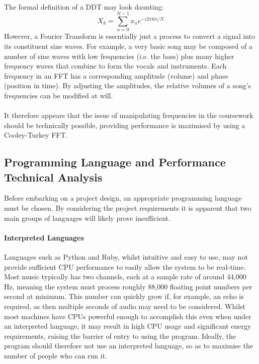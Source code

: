 \paragraph{}
The formal definition of a DDT may look daunting:
\[
X_k = \sum_{n=0}^{N-1} x_n e^{-i2\pi k n/N}
\]
However, a Fourier Transform is essentially just a process to convert a signal into its constituent sine waves. For example, a very basic song may be composed of a number of sine waves with low frequencies (i.e. the bass) plus many higher frequency waves that combine to form the vocals and instruments. Each frequency in an FFT has a corresponding amplitude (volume) and phase (position in time). By adjusting the amplitudes, the relative volumes of a song's frequencies can be modified at will.

\paragraph{}
It therefore appears that the issue of manipulating frequencies in the coursework should be technically possible, providing performance is maximised by using a Cooley-Turkey FFT.

\pagebreak
\subsection{Programming Language  and Performance Technical Analysis}
Before embarking on a project design, an appropriate programming language must be chosen. By considering the project requirements it is apparent that two main groups of languages will likely prove insufficient.

\paragraph{Interpreted Languages}
Languages such as Python and Ruby, whilst intuitive and easy to use, may not provide sufficient CPU performance to easily allow the system to be real-time. Most music typically has two channels, each at a sample rate of around 44,000 Hz, meaning the system must process roughly 88,000 floating point numbers per second at minimum. This number can quickly grow if, for example, an echo is required, as then multiple seconds of audio may need to be considered. Whilst most machines have CPUs powerful enough to accomplish this even when under an interpreted language, it may result in high CPU usage and significant energy requirements, raising the barrier of entry to using the program. Ideally, the program should therefore not use an interpreted language, so as to maximise the number of people who can run it.

